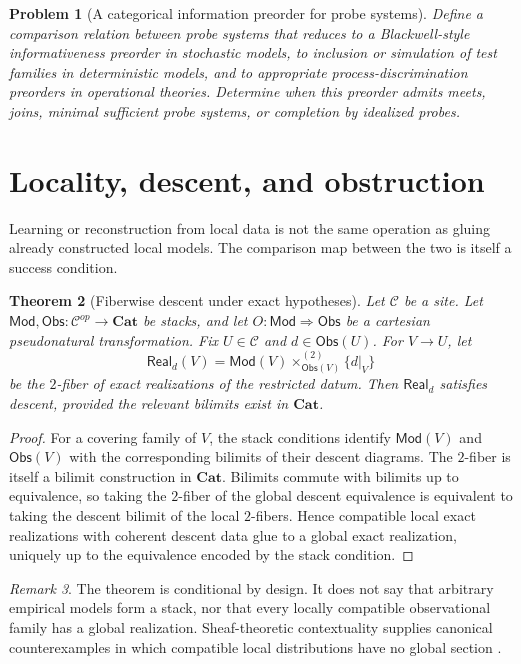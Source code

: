 \documentclass[11pt]{article}
\newtheorem{theorem}{Theorem}[section]
\newtheorem{problem}[theorem]{Problem}
\theoremstyle{definition}
\theoremstyle{remark}
\newtheorem{remark}[theorem]{Remark}
\newcommand{\Real}{\mathsf{Real}}
\newcommand{\Obs}{\mathsf{Obs}}
\newcommand{\Mod}{\mathsf{Mod}}
\newcommand{\Cat}{\mathbf{Cat}}
\begin{document}
\begin{problem}[A categorical information preorder for probe systems]
Define a comparison relation between probe systems that reduces to a Blackwell-style informativeness preorder in stochastic models, to inclusion or simulation of test families in deterministic models, and to appropriate process-discrimination preorders in operational theories. Determine when this preorder admits meets, joins, minimal sufficient probe systems, or completion by idealized probes.
\end{problem}

\section{Locality, descent, and obstruction}

Learning or reconstruction from local data is not the same operation as gluing already constructed local models. The comparison map between the two is itself a success condition.

\begin{theorem}[Fiberwise descent under exact hypotheses]
Let $\mathcal C$ be a site. Let $\Mod,\Obs:\mathcal C^{op}\to\Cat$ be stacks, and let $O:\Mod\Rightarrow\Obs$ be a cartesian pseudonatural transformation. Fix $U\in\mathcal C$ and $d\in\Obs(U)$. For $V\to U$, let
\[
\Real_d(V)=\Mod(V)\times^{(2)}_{\Obs(V)}\{d|_V\}
\]
be the $2$-fiber of exact realizations of the restricted datum. Then $\Real_d$ satisfies descent, provided the relevant bilimits exist in $\Cat$.
\end{theorem}

\begin{proof}
For a covering family of $V$, the stack conditions identify $\Mod(V)$ and $\Obs(V)$ with the corresponding bilimits of their descent diagrams. The $2$-fiber is itself a bilimit construction in $\Cat$. Bilimits commute with bilimits up to equivalence, so taking the $2$-fiber of the global descent equivalence is equivalent to taking the descent bilimit of the local $2$-fibers. Hence compatible local exact realizations with coherent descent data glue to a global exact realization, uniquely up to the equivalence encoded by the stack condition.
\end{proof}

\begin{remark}
The theorem is conditional by design. It does not say that arbitrary empirical models form a stack, nor that every locally compatible observational family has a global realization. Sheaf-theoretic contextuality supplies canonical counterexamples in which compatible local distributions have no global section \cite{AbramskyBrandenburger2011}.
\end{remark}
\end{document}
